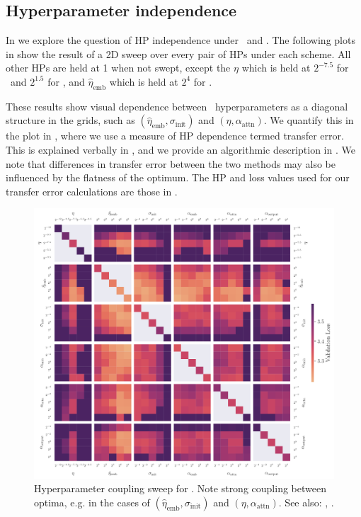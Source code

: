 \subsection{Hyperparameter independence}

In  we explore the question of HP independence under \mup\ and \umup. The following plots in  show the result of a 2D sweep over every pair of HPs under each scheme. All other HPs are held at 1 when not swept, except the $\eta$ which is held at $2^{-7.5}$ for \mup\ and $2^{1.5}$ for \umup, and $\hat{\eta}_\mathrm{emb}$ which is held at $2^4$ for \mup.

These results show visual dependence between \mup\ hyperparameters as a diagonal structure in the grids, such as $(\hat{\eta}_{\mathrm{emb}}, \sigma_{\mathrm{init}})$ and $(\eta, \alpha_{\mathrm{attn}})$. We quantify this in the plot in , where we use a measure of HP dependence termed transfer error. This is explained verbally in , and we provide an algorithmic description in . We note that differences in transfer error between the two methods may also be influenced by the flatness of the optimum. The HP and loss values used for our transfer error calculations are those in .

\begin{figure}[h]
    \centering
    \includegraphics[width=\textwidth]{arXiv/figures/mult_grid_mup_val.pdf}
    \caption{Hyperparameter coupling sweep for \mup{}. Note strong coupling between optima, e.g. in the cases of $(\hat{\eta}_{\mathrm{emb}}, \sigma_{\mathrm{init}})$ and $(\eta, \alpha_{\mathrm{attn}})$. See also: \umup{}, .}
    \label{fig:additional_experiments:mult_grid_mup}
\end{figure}

